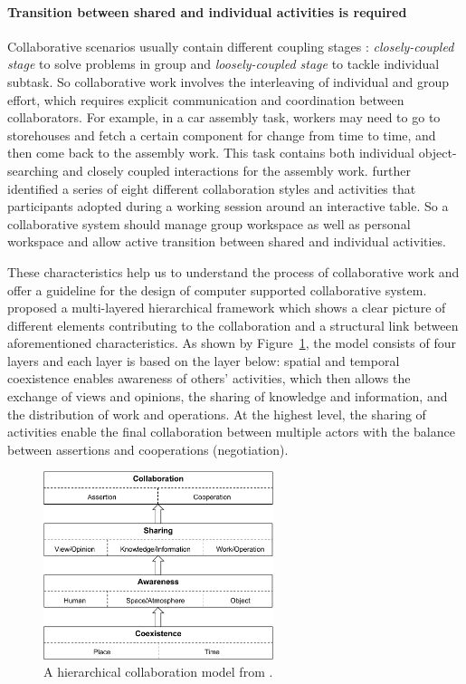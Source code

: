\paragraph{Transition between shared and individual activities is required} Collaborative scenarios usually contain different coupling stages \citep{Gutwin1998Design, Lissermann2014PMC}: \textit{closely-coupled stage} to solve problems in group and \textit{loosely-coupled stage} to tackle individual subtask. So collaborative work involves the interleaving of individual and group effort, which requires explicit communication and coordination between collaborators. For example, in a car assembly task, workers may need to go to storehouses and fetch a certain component for change from time to time, and then come back to the assembly work. This task contains both individual object-searching and closely coupled interactions for the assembly work. \citet{Isenberg2012Co} further identified a series of eight different collaboration styles and activities that participants adopted during a working session around an interactive table. So a collaborative system should manage group workspace as well as personal workspace and allow active transition between shared and individual activities.


These characteristics help us to understand the process of collaborative work and offer a guideline for the design of computer supported collaborative system. \citet{Okada2007Collab} proposed a multi-layered hierarchical framework which shows a clear picture of different elements contributing to the collaboration and a structural link between aforementioned characteristics. As shown by Figure~\ref{fig:1_collab_model}, the model consists of four layers and each layer is based on the layer below: spatial and temporal coexistence enables awareness of others' activities, which then allows the exchange of views and opinions, the sharing of knowledge and information, and the distribution of work and operations. At the highest level, the sharing of activities enable the final collaboration between multiple actors with the balance between assertions and cooperations (negotiation).

\begin{figure}[htb]
  \centering
  \includegraphics[width=0.6\textwidth]{figures/ch1/collab_model}
  \caption{\label{fig:1_collab_model}A hierarchical collaboration model from \citet{Okada2007Collab}.}
\end{figure}

